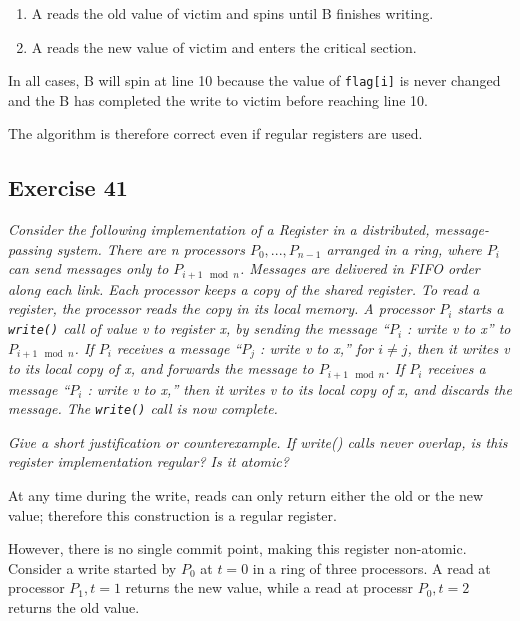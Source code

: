 \documentclass[a4paper,10pt]{article}
\begin{document}
\begin{enumerate}
\item A reads the old value of victim and spins until B finishes writing.
\item A reads the new value of victim and enters the critical section.
\end{enumerate}

In all cases, B will spin at line 10 because the value of \lstinline|flag[i]| is never
changed and the B has completed the write to victim before reaching line 10.

The algorithm is therefore correct even if regular registers are used.

\subsection{Exercise 41}

\emph{Consider the following implementation of a Register in a distributed, 
message-passing system. There are n processors $P_0, ..., P_{n-1}$ arranged in
a ring, where $P_i$ can send messages only to $P_{i+1 \mod n}$. Messages are delivered
in FIFO order along each link.
Each processor keeps a copy of the shared register.
To read a register, the processor reads the copy in its local memory.
A processor $P_i$ starts a \lstinline|write()| call of value v to register x, by sending the
message ``$P_i$ : write v to x'' to $P_{i+1 \mod n}$.
If $P_i$ receives a message ``$P_j$ : write v to x,'' for $i \neq j$, then it writes v to its local
copy of x, and forwards the message to $P_{i+1 \mod n}$.
If $P_i$ receives a message ``$P_i$ : write v to x,'' then it writes v to its local copy of x,
and discards the message. The \lstinline|write()| call is now complete.}

\emph{Give a short justification or counterexample.
If write() calls never overlap, is this register implementation regular? Is it atomic?}

\vspace{3mm}

At any time during the write, reads can only return either the old or the new value;
therefore this construction is a regular register. 

However, there is no single commit point, making this register non-atomic. Consider
a write started by $P_0$ at $t = 0$ in a ring
of three processors. A read at processor $P_1, t = 1$ returns the new value,
while a read at processr $P_0, t = 2$ returns the old value.

\vspace{3mm}
\end{document}
